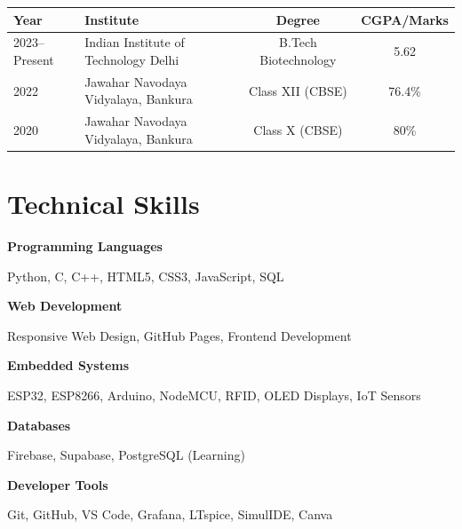 \documentclass[10pt,a4paper]{article}
\begin{document}
\begin{tabularx}{\linewidth}{|l|X|c|c|}
\hline

\textbf{Year}
&
\textbf{Institute}
&
\textbf{Degree}
&
\textbf{CGPA/Marks}

\\
\hline

2023--Present
&
Indian Institute of Technology Delhi
&
B.Tech Biotechnology
&
5.62

\\
\hline

2022
&
Jawahar Navodaya Vidyalaya, Bankura
&
Class XII (CBSE)
&
76.4\%

\\
\hline

2020
&
Jawahar Navodaya Vidyalaya, Bankura
&
Class X (CBSE)
&
80\%

\\
\hline

\end{tabularx}


\section*{Technical Skills}

\textbf{Programming Languages}

Python, C, C++, HTML5, CSS3, JavaScript, SQL

\vspace{3pt}

\textbf{Web Development}

Responsive Web Design, GitHub Pages, Frontend Development

\vspace{3pt}

\textbf{Embedded Systems}

ESP32, ESP8266, Arduino, NodeMCU, RFID, OLED Displays, IoT Sensors

\vspace{3pt}

\textbf{Databases}

Firebase, Supabase, PostgreSQL (Learning)

\vspace{3pt}

\textbf{Developer Tools}

Git, GitHub, VS Code, Grafana, LTspice, SimulIDE, Canva
\end{document}
